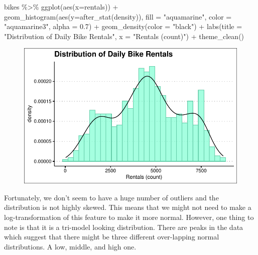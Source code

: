 \documentclass[
  letterpaper,
  DIV=11,
  numbers=noendperiod]{scrartcl}
\newenvironment{Shaded}{\begin{snugshade}}{\end{snugshade}}
\newcommand{\AttributeTok}[1]{\textcolor[rgb]{0.40,0.45,0.13}{#1}}
\newcommand{\FloatTok}[1]{\textcolor[rgb]{0.68,0.00,0.00}{#1}}
\newcommand{\FunctionTok}[1]{\textcolor[rgb]{0.28,0.35,0.67}{#1}}
\newcommand{\NormalTok}[1]{\textcolor[rgb]{0.00,0.23,0.31}{#1}}
\newcommand{\SpecialCharTok}[1]{\textcolor[rgb]{0.37,0.37,0.37}{#1}}
\newcommand{\StringTok}[1]{\textcolor[rgb]{0.13,0.47,0.30}{#1}}
\begin{document}
\begin{Shaded}
\begin{Highlighting}[]
\NormalTok{bikes }\SpecialCharTok{\%\textgreater{}\%}
  \FunctionTok{ggplot}\NormalTok{(}\FunctionTok{aes}\NormalTok{(}\AttributeTok{x=}\NormalTok{rentals)) }\SpecialCharTok{+} 
  \FunctionTok{geom\_histogram}\NormalTok{(}\FunctionTok{aes}\NormalTok{(}\AttributeTok{y=}\FunctionTok{after\_stat}\NormalTok{(density)),}
                 \AttributeTok{fill =} \StringTok{"aquamarine"}\NormalTok{,}
                 \AttributeTok{color =} \StringTok{"aquamarine3"}\NormalTok{,}
                 \AttributeTok{alpha =} \FloatTok{0.7}\NormalTok{) }\SpecialCharTok{+}
  \FunctionTok{geom\_density}\NormalTok{(}\AttributeTok{color =} \StringTok{"black"}\NormalTok{) }\SpecialCharTok{+}
  \FunctionTok{labs}\NormalTok{(}\AttributeTok{title =} \StringTok{"Distribution of Daily Bike Rentals"}\NormalTok{,}
       \AttributeTok{x =} \StringTok{"Rentals (count)"}\NormalTok{) }\SpecialCharTok{+}
  \FunctionTok{theme\_clean}\NormalTok{()}
\end{Highlighting}
\end{Shaded}

\begin{figure}[H]

{\centering \includegraphics{index_files/figure-pdf/unnamed-chunk-12-1.pdf}

}

\end{figure}

Fortunately, we don't seem to have a huge number of outliers and the
distribution is not highly skewed. This means that we might not need to
make a log-transformation of this feature to make it more normal.
However, one thing to note is that it is a tri-model looking
distribution. There are peaks in the data which suggest that there might
be three different over-lapping normal distributions. A low, middle, and
high one.
\end{document}

